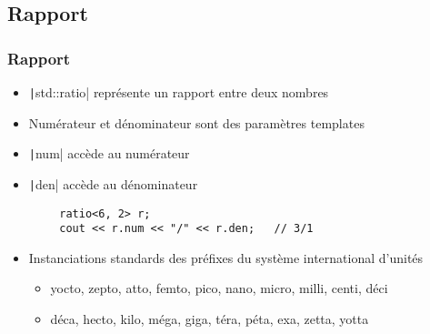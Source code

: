 \documentclass[C++.tex]{subfiles}
\begin{document}
\subsection*{Rapport}
\begin{frame}[fragile]
	\frametitle{Rapport}


	\begin{itemize}
		\item \texttt|std::ratio| représente un rapport entre deux nombres
		\item Numérateur et dénominateur sont des paramètres templates
		\item \texttt|num| accède au numérateur
		\item \texttt|den| accède au dénominateur
	\end{itemize}

	\begin{verbatim}
		ratio<6, 2> r;
		cout << r.num << "/" << r.den;   // 3/1
	\end{verbatim}

	\begin{itemize}
		\item Instanciations standards des préfixes du système international d'unités
		\begin{itemize}
			\item yocto, zepto, atto, femto, pico, nano, micro, milli, centi, déci
			\item déca, hecto, kilo, méga, giga, téra, péta, exa, zetta, yotta
		\end{itemize}
	\end{itemize}
\end{frame}
\end{document}

